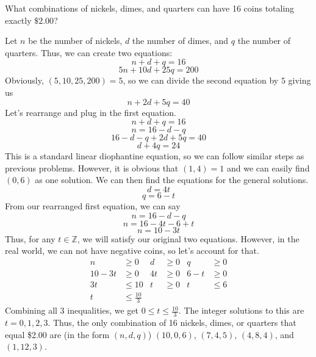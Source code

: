 \documentclass{article}
\begin{document}
\begin{problem}{}{}
    What combinations of nickels, dimes, and quarters can have 16 coins totaling exactly $\$2.00$?
\end{problem}
\begin{solution}{}{}
    Let $n$ be the number of nickels, $d$ the number of dimes, and $q$ the number of quarters. Thus, we can create two equations:
    \[n+d+q=16\]
    \[5n+10d+25q=200\]
    Obviously, $(5,10,25,200)=5$, so we can divide the second equation by $5$ giving us
    \[n+2d+5q=40\]
    Let's rearrange and plug in the first equation.
    \[n+d+q=16\]
    \[n=16-d-q\]
    \[16-d-q+2d+5q=40\]
    \[d+4q=24\]
    This is a standard linear diophantine equation, so we can follow similar steps as previous problems. However, it is obvious that $(1,4)=1$ and we can easily find $(0,6)$ as one solution. We can then find the equations for the general solutions.
    \[d=4t\]
    \[q=6-t\]
    From our rearranged first equation, we can say
    \[n=16-d-q\]
    \[n=16-4t-6+t\]
    \[n=10-3t\]
    Thus, for any $t\in\mathbb{Z}$, we will satisfy our original two equations. However, in the real world, we can not have negative coins, so let's account for that.
    \begin{align*}
        n&\geq0 & d&\geq0 & q&\geq0 \\
        10-3t&\geq0 & 4t&\geq0 & 6-t&\geq0 \\
        3t&\leq10 & t&\geq0 & t&\leq6 \\
        t&\leq\frac{10}{3} & &
    \end{align*}
    Combining all 3 inequalities, we get $0\leq t\leq\frac{10}{3}$. The integer solutions to this are $t=0,1,2,3$. Thus, the only combination of 16 nickels, dimes, or quarters that equal \$2.00 are (in the form $(n,d,q)$) $(10,0,6)$, $(7,4,5)$, $(4,8,4)$, and $(1,12,3)$.
\end{solution}
\end{document}
